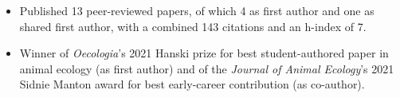 


\begin{itemize}[noitemsep] 
  \item Published 13 peer-reviewed papers, of which 4 as first author and one as shared first author, with a combined 143 citations and an h-index of 7.
  \item Winner of \textit{Oecologia}'s 2021 Hanski prize for best student-authored paper in animal ecology (as first author) and of the \textit{Journal of Animal Ecology}'s 2021 Sidnie Manton award for best early-career contribution (as co-author).
\end{itemize}